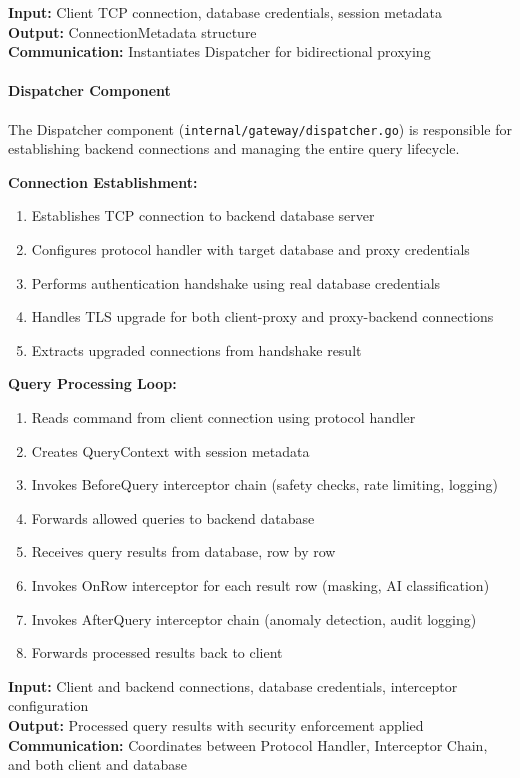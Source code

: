 \textbf{Input:} Client TCP connection, database credentials, session metadata\\
\textbf{Output:} ConnectionMetadata structure\\
\textbf{Communication:} Instantiates Dispatcher for bidirectional proxying

\paragraph{Dispatcher Component}

The Dispatcher component (\texttt{internal/gateway/dispatcher.go}) is responsible for establishing backend connections and managing the entire query lifecycle.

\textbf{Connection Establishment:}
\begin{enumerate}[leftmargin=*]
    \item Establishes TCP connection to backend database server
    \item Configures protocol handler with target database and proxy credentials
    \item Performs authentication handshake using real database credentials
    \item Handles TLS upgrade for both client-proxy and proxy-backend connections
    \item Extracts upgraded connections from handshake result
\end{enumerate}

\textbf{Query Processing Loop:}
\begin{enumerate}[leftmargin=*]
    \item Reads command from client connection using protocol handler
    \item Creates QueryContext with session metadata
    \item Invokes BeforeQuery interceptor chain (safety checks, rate limiting, logging)
    \item Forwards allowed queries to backend database
    \item Receives query results from database, row by row
    \item Invokes OnRow interceptor for each result row (masking, AI classification)
    \item Invokes AfterQuery interceptor chain (anomaly detection, audit logging)
    \item Forwards processed results back to client
\end{enumerate}

\textbf{Input:} Client and backend connections, database credentials, interceptor configuration\\
\textbf{Output:} Processed query results with security enforcement applied\\
\textbf{Communication:} Coordinates between Protocol Handler, Interceptor Chain, and both client and database

